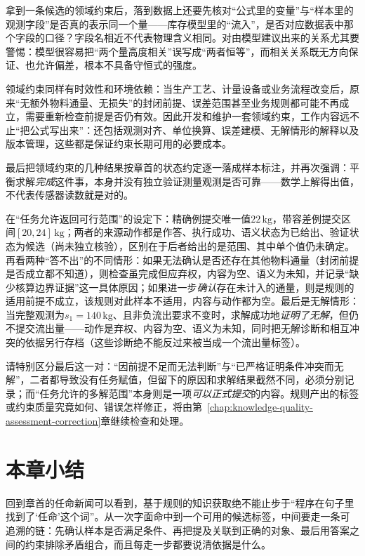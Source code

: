 拿到一条候选的领域约束后，落到数据上还要先核对“公式里的变量”与“样本里的观测字段”是否真的表示同一个量——库存模型里的“流入”，是否对应数据表中那个字段的口径？字段名相近不代表物理含义相同。对由模型建议出来的关系尤其要警惕：模型很容易把“两个量高度相关”误写成“两者恒等”，而相关关系既无方向保证、也允许偏差，根本不具备守恒式的强度。

领域约束同样有时效性和环境依赖：当生产工艺、计量设备或业务流程改变后，原来“无额外物料通量、无损失”的封闭前提、误差范围甚至业务规则都可能不再成立，需要重新检查前提是否仍有效。因此开发和维护一套领域约束，工作内容远不止“把公式写出来”：还包括观测对齐、单位换算、误差建模、无解情形的解释以及版本管理，这些都是保证约束长期可用的必要成本。

最后把领域约束的几种结果按章首的状态约定逐一落成样本标注，并再次强调：平衡求解\emph{完成}这件事，本身并没有独立验证测量观测是否可靠——数学上解得出值，不代表传感器读数就是对的。

在“任务允许返回可行范围”的设定下：精确例提交唯一值$22\,\mathrm{kg}$，带容差例提交区间$[20,24]\,\mathrm{kg}$；两者的来源动作都是作答、执行成功、语义状态为已给出、验证状态为候选（尚未独立核验），区别在于后者给出的是范围、其中单个值仍未确定。再看两种“答不出”的不同情形：如果无法确认是否还存在其他物料通量（封闭前提是否成立都不知道），则检查虽完成但应弃权，内容为空、语义为未知，并记录“缺少核算边界证据”这一具体原因；如果进一步\emph{确认}存在未计入的通量，则是规则的适用前提不成立，该规则对此样本不适用，内容与动作都为空。最后是无解情形：当完整观测为$s_1=140\,\mathrm{kg}$、且非负流出要求不变时，求解成功地\emph{证明了无解}，但仍不提交流出量——动作是弃权、内容为空、语义为未知，同时把无解诊断和相互冲突的依据另行存档（这些诊断绝不能反过来被当成一个流出量标签）。

请特别区分最后这一对：“因前提不足而无法判断”与“已严格证明条件冲突而无解”，二者都导致没有任务赋值，但留下的原因和求解结果截然不同，必须分别记录；而“任务允许的多解范围”本身则是一项\emph{可以正式提交}的内容。规则产出的标签或约束质量究竟如何、错误怎样修正，将由第~\ref{chap:knowledge-quality-assessment-correction}章继续检查和处理。

\section{本章小结}
\label{sec:rule-based-knowledge-acquisition-summary}

回到章首的任命新闻可以看到，基于规则的知识获取绝不能止步于“程序在句子里找到了‘任命’这个词”。从一次字面命中到一个可用的候选标签，中间要走一条可追溯的链：先确认样本是否满足条件、再把提及关联到正确的对象、最后用答案之间的约束排除矛盾组合，而且每走一步都要说清依据是什么。

